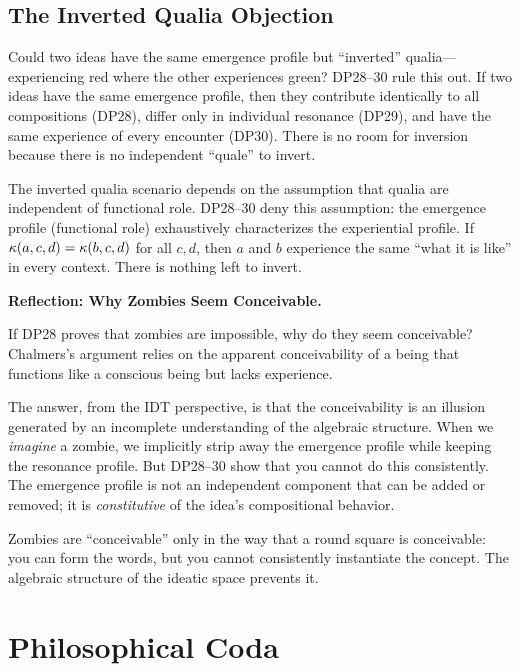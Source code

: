 \subsection{The Inverted Qualia Objection}

Could two ideas have the same emergence profile but ``inverted''
qualia---experiencing red where the other experiences green?  DP28--30
rule this out.  If two ideas have the same emergence profile, then
they contribute identically to all compositions (DP28), differ only
in individual resonance (DP29), and have the same experience of every
encounter (DP30).  There is no room for inversion because there is
no independent ``quale'' to invert.

The inverted qualia scenario depends on the assumption that qualia
are independent of functional role.  DP28--30 deny this assumption:
the emergence profile (functional role) exhaustively characterizes
the experiential profile.  If $\kappa(a, c, d) = \kappa(b, c, d)$
for all $c, d$, then $a$ and $b$ experience the same ``what it is
like'' in every context.  There is nothing left to invert.

\begin{reflectionbox}
\noindent\textbf{Reflection: Why Zombies Seem Conceivable.}

If DP28 proves that zombies are impossible, why do they seem conceivable?
Chalmers's argument relies on the apparent conceivability of a being
that functions like a conscious being but lacks experience.

The answer, from the IDT perspective, is that the conceivability is an
illusion generated by an incomplete understanding of the algebraic
structure.  When we \emph{imagine} a zombie, we implicitly strip away the
emergence profile while keeping the resonance profile.  But DP28--30 show
that you cannot do this consistently.  The emergence profile is not an
independent component that can be added or removed; it is \emph{constitutive}
of the idea's compositional behavior.

Zombies are ``conceivable'' only in the way that a round square is
conceivable: you can form the words, but you cannot consistently
instantiate the concept.  The algebraic structure of the ideatic space
prevents it.
\end{reflectionbox}

\section{Philosophical Coda}

